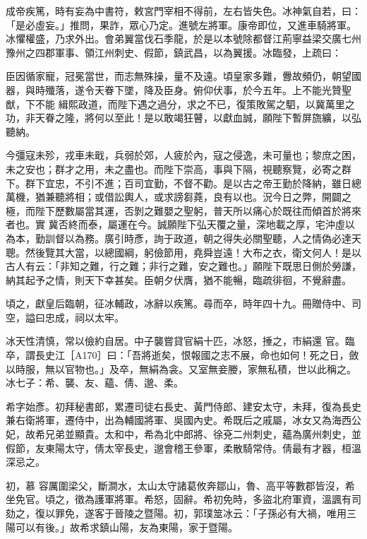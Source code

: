 \begin{pinyinscope}
 成帝疾篤，時有妄為中書符，敕宮門宰相不得前，左右皆失色。冰神氣自若，曰：「是必虛妄。」推問，果詐，眾心乃定。進號左將軍。康帝即位，又進車騎將軍。冰懼權盛，乃求外出。會弟翼當伐石季龍，於是以本號除都督江荊寧益梁交廣七州豫州之四郡軍事、領江州刺史、假節，鎮武昌，以為翼援。冰臨發，上疏曰：



 臣因循家寵，冠冕當世，而志無殊操，量不及遠。頃皇家多難，釁故頻仍，朝望國器，與時殲落，遂令天眷下墜，降及臣身。俯仰伏事，於今五年。上不能光贊聖猷，下不能
 緝熙政道，而陛下遇之過分，求之不已，復策敗駕之駟，以冀萬里之功，非天眷之隆，將何以至此！是以敢竭狂瞽，以獻血誠，願陛下暫屏旒纊，以弘聽納。



 今彊寇未殄，戎車未戢，兵弱於郊，人疲於內，寇之侵逸，未可量也；黎庶之困，未之安也；群才之用，未之盡也。而陛下崇高，事與下隔，視聽察覽，必寄之群下。群下宜忠，不引不進；百司宜勤，不督不勸。是以古之帝王勤於降納，雖日總萬機，猶兼聽將相；或借訟輿人，或求謗芻蕘，良有以也。況今日之弊，開闢之極，而陛下歷數屬當其運，否剝之難嬰之聖躬，普天所以痛心於既往而傾首於將來者也。實
 冀否終而泰，屬運在今。誠願陛下弘天覆之量，深地載之厚，宅沖虛以為本，勤訓督以為務。廣引時彥，詢于政道，朝之得失必關聖聽，人之情偽必達天聰。然後覽其大當，以總國綱，躬儉節用，堯舜豈遠！大布之衣，衛文何人！是以古人有云：「非知之難，行之難；非行之難，安之難也。」願陛下既思日側於勞謙，納其起予之情，則天下幸甚矣。臣朝夕伏膺，猶不能暢，臨疏徘徊，不覺辭盡。



 頃之，獻皇后臨朝，征冰輔政，冰辭以疾篤。尋而卒，時年四十九。冊贈侍中、司空，謚曰忠成，祠以太牢。



 冰天性清慎，常以儉約自居。中子襲嘗貸官絹十匹，冰怒，捶之，市絹還
 官。臨卒，謂長史江［A170］曰：「吾將逝矣，恨報國之志不展，命也如何！死之日，斂以時服，無以官物也。」及卒，無絹為衾。又室無妾媵，家無私積，世以此稱之。冰七子：希、襲、友、蘊、倩、邈、柔。



 希字始彥。初拜秘書郎，累遷司徒右長史、黃門侍郎、建安太守，未拜，復為長史兼右衛將軍，遷侍中，出為輔國將軍、吳國內史。希既后之戚屬，冰女又為海西公妃，故希兄弟並顯貴。太和中，希為北中郎將、徐兗二州刺史，蘊為廣州刺史，並假節，友東陽太守，倩太宰長史，邈會稽王參軍，柔散騎常侍。倩最有才器，桓溫深忌之。



 初，慕
 容厲圍梁父，斷澗水，太山太守諸葛攸奔鄒山，魯、高平等數郡皆沒，希坐免官。頃之，徵為護軍將軍。希怒，固辭。希初免時，多盜北府軍資，溫諷有司劾之，復以罪免，遂客于晉陵之暨陽。初，郭璞筮冰云：「子孫必有大禍，唯用三陽可以有後。」故希求鎮山陽，友為東陽，家于暨陽。




\end{pinyinscope}
